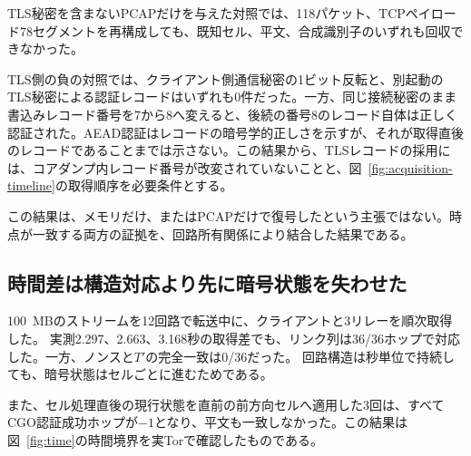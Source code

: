 \documentclass[10pt,a4paper]{ltjsarticle}
\begin{document}
TLS秘密を含まないPCAPだけを与えた対照では、118パケット、TCPペイロード78セグメントを再構成しても、既知セル、平文、合成識別子のいずれも回収できなかった。

TLS側の負の対照では、クライアント側通信秘密の1ビット反転と、別起動のTLS秘密による認証レコードはいずれも0件だった。一方、同じ接続秘密のまま書込みレコード番号を7から8へ変えると、後続の番号8のレコード自体は正しく認証された。AEAD認証はレコードの暗号学的正しさを示すが、それが取得直後のレコードであることまでは示さない。この結果から、TLSレコードの採用には、コアダンプ内レコード番号が改変されていないことと、図~\ref{fig:acquisition-timeline}の取得順序を必要条件とする。

この結果は、メモリだけ、またはPCAPだけで復号したという主張ではない。時点が一致する両方の証拠を、回路所有関係により結合した結果である。

\subsection{時間差は構造対応より先に暗号状態を失わせた}

100~MBのストリームを12回路で転送中に、クライアントと3リレーを順次取得した。
実測2.297、2.663、3.168秒の取得差でも、リンク列は36/36ホップで対応した。一方、ノンスと$T'$の完全一致は0/36だった。
回路構造は秒単位で持続しても、暗号状態はセルごとに進むためである。

また、セル処理直後の現行状態を直前の前方向セルへ適用した3回は、すべてCGO認証成功ホップが$-1$となり、平文も一致しなかった。この結果は図~\ref{fig:time}の時間境界を実Torで確認したものである。
\end{document}
